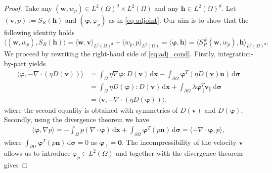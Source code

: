\documentclass[10pt,a4paper]{amsart}
\newcommand{\dd}{\, \mathrm{d}}
\newcommand{\lzd}{{L^2(\Omega)^d}}
\newcommand{\lzo}{L^2(\Omega)}
\begin{document}
\begin{proof}  Take any $(\mathbf{w},w_p)\in \lzd \times \lzo$ and any $\mathbf{h}\in\lzd$. 
    Let $(\mathbf{v},p):=S_R(\mathbf{h})$ and $\left(\boldsymbol{\varphi},\varphi_p\right)$ as in \eqref{eq-adjoint}.
    Our aim is to show that the following identity holds
    \begin{equation}
    \langle (\mathbf{w},w_p),S_R(\mathbf{h})\rangle = 
        \langle \mathbf{w}, \mathbf{v} \rangle_{\lzd} + \langle w_p , p \rangle_{\lzo} = \langle \boldsymbol{\varphi} , \mathbf{h} \rangle =
        \langle S_R^{\#} (\mathbf{w},w_p), \mathbf{h} \rangle_{\lzd}.
        \label{eq:adj_cond}
    \end{equation}
    We proceed by rewriting the right-hand side of \eqref{eq:adj_cond}. Firstly, integration-by-part yields
    \begin{equation}
    \begin{split}
         \langle \boldsymbol{\varphi}, - \nabla \cdot (\eta D(\mathbf{v})) \rangle &= \int_\Omega \eta \nabla \boldsymbol{\varphi} : D(\mathbf{v}) \dd \mathbf{x} - \int_{\partial \Omega} \boldsymbol{\varphi}^{T} (\eta D(\mathbf{v}) \mathbf{n} ) \dd \boldsymbol{\sigma} \\
         & = \int_\Omega \eta D(\boldsymbol{\varphi}) : D(\mathbf{v}) \dd \mathbf{x} + \int_{\partial\Omega} \lambda \boldsymbol{\varphi}_{||}^T \mathbf{v}_{||} \dd \boldsymbol{\sigma} \\
         & = \langle \mathbf{v}, - \nabla \cdot (\eta D(\boldsymbol{\varphi}) )\rangle,
         \label{eq:srad_proof_v}
    \end{split}
    \end{equation}
    where the second equality is obtained with symmetries of $D(\mathbf{v})$ and $D(\boldsymbol{\varphi})$.
    Secondly, using the divergence theorem we have 
    \begin{equation}\label{eq:srad_proof_p}
        \begin{split}
            \langle \boldsymbol{\varphi}, \nabla p\rangle = - \int_\Omega  p (\nabla \cdot\boldsymbol{\varphi}) \dd \mathbf{x} + \int_{\partial\Omega} \boldsymbol{\varphi}^T (p \mathbf{n}) \dd \boldsymbol{\sigma} 
                                = \langle - \nabla \cdot \boldsymbol{\varphi}, p\rangle,
        \end{split}
    \end{equation}
    where $\int_{\partial\Omega} \boldsymbol{\varphi}^T (p \mathbf{n}) \dd \boldsymbol{\sigma} = 0$ as $\boldsymbol{\varphi}_\bot = \mathbf{0}$.
    The incompressibility of the velocity $\mathbf{v}$ allows us to introduce $\varphi_p\in\lzo$ and together with the divergence theorem gives

\end{proof}
\end{document}
